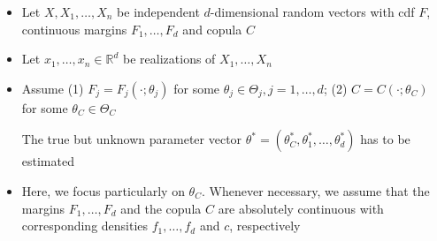 \begin{itemize}[leftmargin=*]
    \item Let $X, X_{1}, \ldots, X_{n}$ be independent $d$-dimensional random vectors with cdf $F$, continuous margins $F_{1}, \ldots, F_{d}$ and copula $C$
    \item Let $x_{1}, \ldots, x_{n} \in \mathbb{R}^{d}$ be realizations of $X_{1}, \ldots, X_{n}$
    \item Assume (1) $F_{j}=F_{j}\left(\cdot ; \theta_{j}\right)$ for some $\theta_{j} \in \Theta_{j}, j=1, \ldots, d$; (2) $C=C\left(\cdot ; \theta_{C}\right)$ for some $\theta_{C} \in \Theta_{C}$

The true but unknown parameter vector $\theta^{*}=\left(\theta_{C}^{*}, \theta_{1}^{*}, \ldots, \theta_{d}^{*}\right)$ has to be estimated
    \item Here, we focus particularly on $\theta_{C}$. Whenever necessary, we assume that the margins $F_{1}, \ldots, F_{d}$ and the copula $C$ are absolutely continuous with corresponding densities $f_{1}, \ldots, f_{d}$ and $c$, respectively
\end{itemize}



